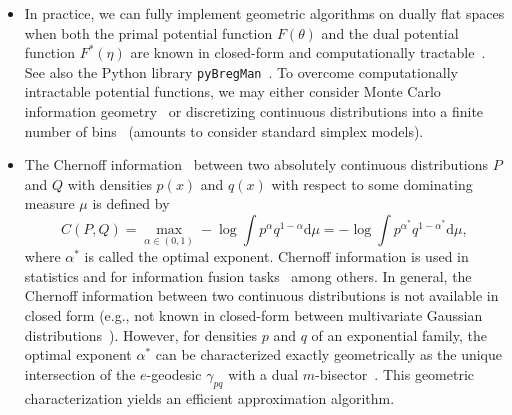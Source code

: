 \documentclass[11pt]{article}
\begin{document}
\begin{itemize}
\item In practice, we can fully implement geometric algorithms on dually flat spaces when both the primal potential function $F(\theta)$ and the dual potential function $F^*(\eta)$ are known in closed-form and computationally tractable~\cite{MCIG-2019}. See also the Python library {\tt pyBregMan}~\cite{pyBregMan-2024}.
To overcome computationally intractable potential functions, we may either consider Monte Carlo information geometry~\cite{MCIG-2019} or discretizing continuous distributions into a finite number of bins~\cite{Critchley-2014,CIG-2017} (amounts to consider standard simplex models). 

\item The Chernoff information~\cite{Chernoff-1952} between two absolutely continuous distributions $P$ and $Q$ with densities $p(x)$ and $q(x)$ with respect to some dominating measure $\mu$ is defined by
$$
C(P,Q)=\max_{\alpha\in (0,1)} -\log\int p^\alpha q^{1-\alpha}\mathrm{d}\mu
=-\log\int p^{\alpha^*} q^{1-{\alpha^*}}\mathrm{d}\mu,
$$
where $\alpha^*$ is called the optimal exponent.
Chernoff information is used in statistics and for information fusion tasks~\cite{ChernoffJulier-2006} among others.
In general, the Chernoff information between two continuous distributions is not available in closed form (e.g., not known in closed-form between multivariate Gaussian distributions~\cite{ChernoffNielsen-2022}).
However, for densities $p$ and $q$ of an exponential family, the optimal exponent $\alpha^*$ can be characterized exactly geometrically as the unique intersection of the $e$-geodesic $\gamma_{pq}$ with a dual $m$-bisector~\cite{ChernoffNielsen-2013}. This geometric characterization yields an efficient approximation algorithm.
\end{itemize}
\end{document}

